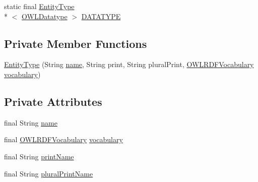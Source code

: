 \begin{DoxyCompactItemize}
\item 
static final \hyperlink{classorg_1_1semanticweb_1_1owlapi_1_1model_1_1_entity_type_3_01_e_01extends_01_o_w_l_entity_01_4_a69573aa3044dd02aabd1c8bac00cb4e6}{Entity\-Type}\\*
$<$ \hyperlink{interfaceorg_1_1semanticweb_1_1owlapi_1_1model_1_1_o_w_l_datatype}{O\-W\-L\-Datatype} $>$ \hyperlink{classorg_1_1semanticweb_1_1owlapi_1_1model_1_1_entity_type_3_01_e_01extends_01_o_w_l_entity_01_4_a13b2fbb5eb3360ceddab6cab43698d98}{D\-A\-T\-A\-T\-Y\-P\-E}
\end{DoxyCompactItemize}
\subsection*{Private Member Functions}
\begin{DoxyCompactItemize}
\item 
\hyperlink{classorg_1_1semanticweb_1_1owlapi_1_1model_1_1_entity_type_3_01_e_01extends_01_o_w_l_entity_01_4_a69573aa3044dd02aabd1c8bac00cb4e6}{Entity\-Type} (String \hyperlink{classorg_1_1semanticweb_1_1owlapi_1_1model_1_1_entity_type_3_01_e_01extends_01_o_w_l_entity_01_4_a13b25f4f2a82f64e5cdb4ed0d60f6c6b}{name}, String print, String plural\-Print, \hyperlink{enumorg_1_1semanticweb_1_1owlapi_1_1vocab_1_1_o_w_l_r_d_f_vocabulary}{O\-W\-L\-R\-D\-F\-Vocabulary} \hyperlink{classorg_1_1semanticweb_1_1owlapi_1_1model_1_1_entity_type_3_01_e_01extends_01_o_w_l_entity_01_4_a4f9794f343179e622f0973d5b25b8bac}{vocabulary})
\end{DoxyCompactItemize}
\subsection*{Private Attributes}
\begin{DoxyCompactItemize}
\item 
final String \hyperlink{classorg_1_1semanticweb_1_1owlapi_1_1model_1_1_entity_type_3_01_e_01extends_01_o_w_l_entity_01_4_a13b25f4f2a82f64e5cdb4ed0d60f6c6b}{name}
\item 
final \hyperlink{enumorg_1_1semanticweb_1_1owlapi_1_1vocab_1_1_o_w_l_r_d_f_vocabulary}{O\-W\-L\-R\-D\-F\-Vocabulary} \hyperlink{classorg_1_1semanticweb_1_1owlapi_1_1model_1_1_entity_type_3_01_e_01extends_01_o_w_l_entity_01_4_a4f9794f343179e622f0973d5b25b8bac}{vocabulary}
\item 
final String \hyperlink{classorg_1_1semanticweb_1_1owlapi_1_1model_1_1_entity_type_3_01_e_01extends_01_o_w_l_entity_01_4_af5071b2cf95cfd21f7f05768211753c6}{print\-Name}
\item 
final String \hyperlink{classorg_1_1semanticweb_1_1owlapi_1_1model_1_1_entity_type_3_01_e_01extends_01_o_w_l_entity_01_4_a0cb9d2799a8527ee95c59322aa6a5192}{plural\-Print\-Name}
\end{DoxyCompactItemize}
